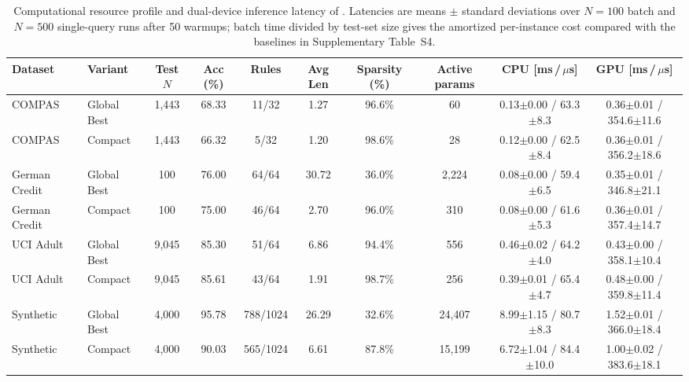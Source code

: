 \begin{table}[t]
\centering
\caption{Computational resource profile and dual-device inference latency of \modelname{}. Latencies are means $\pm$ standard deviations over $N=100$ batch and $N=500$ single-query runs after 50 warmups; batch time divided by test-set size gives the amortized per-instance cost compared with the baselines in Supplementary Table~S4.}
\label{tab:computational_efficiency}
\setlength{\tabcolsep}{2pt}
\begin{tabular}{ll c c ccc c cc}
\toprule
\textbf{Dataset} & \textbf{Variant} & \textbf{Test $N$} & \textbf{Acc (\%)} & \textbf{Rules} & \textbf{Avg Len} & \textbf{Sparsity (\%)} & \textbf{Active params} & \textbf{CPU [ms\,/\,$\mu$s]} & \textbf{GPU [ms\,/\,$\mu$s]} \\
\midrule
COMPAS & Global Best & 1,443 & 68.33 & 11/32 & 1.27 & 96.6\% & 60 & 0.13$\pm$0.00 / 63.3$\pm$8.3 & 0.36$\pm$0.01 / 354.6$\pm$11.6 \\
COMPAS & Compact & 1,443 & 66.32 & 5/32 & 1.20 & 98.6\% & 28 & 0.12$\pm$0.00 / 62.5$\pm$8.4 & 0.36$\pm$0.01 / 356.2$\pm$18.6 \\
\midrule
German Credit & Global Best & 100 & 76.00 & 64/64 & 30.72 & 36.0\% & 2,224 & 0.08$\pm$0.00 / 59.4$\pm$6.5 & 0.35$\pm$0.01 / 346.8$\pm$21.1 \\
German Credit & Compact & 100 & 75.00 & 46/64 & 2.70 & 96.0\% & 310 & 0.08$\pm$0.00 / 61.6$\pm$5.3 & 0.36$\pm$0.01 / 357.4$\pm$14.7 \\
\midrule
UCI Adult & Global Best & 9,045 & 85.30 & 51/64 & 6.86 & 94.4\% & 556 & 0.46$\pm$0.02 / 64.2$\pm$4.0 & 0.43$\pm$0.00 / 358.1$\pm$10.4 \\
UCI Adult & Compact & 9,045 & 85.61 & 43/64 & 1.91 & 98.7\% & 256 & 0.39$\pm$0.01 / 65.4$\pm$4.7 & 0.48$\pm$0.00 / 359.8$\pm$11.4 \\
\midrule
Synthetic & Global Best & 4,000 & 95.78 & 788/1024 & 26.29 & 32.6\% & 24,407 & 8.99$\pm$1.15 / 80.7$\pm$8.3 & 1.52$\pm$0.01 / 366.0$\pm$18.4 \\
Synthetic & Compact & 4,000 & 90.03 & 565/1024 & 6.61 & 87.8\% & 15,199 & 6.72$\pm$1.04 / 84.4$\pm$10.0 & 1.00$\pm$0.02 / 383.6$\pm$18.1 \\
\bottomrule
\end{tabular}
\end{table}
